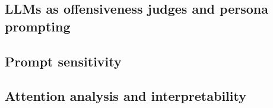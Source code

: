 \subsection{LLMs as offensiveness judges and persona prompting}
\label{sec:related:persona}
\citep{lu2025overconfident,hu2024quantifying,kamruzzaman2025demographic,giorgi2025human,sarumi2025impact,movva2024annotation,salewski2023incontext,gupta2024bias}

\subsection{Prompt sensitivity}
\label{sec:related:prompt}
\citep{zhao2021calibrate,liu2024lost}

\subsection{Attention analysis and interpretability}
\label{sec:related:attention}
\citep{jain2019attention,wiegreffe2019attention,kobayashi2020attention,xiao2024efficient,ghandeharioun2024whos,feng2024unveiling}

